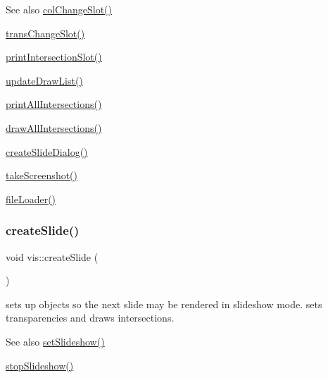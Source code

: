 \begin{DoxySeeAlso}{See also}
\mbox{\hyperlink{classvis_ad217326086a9f0cfc1e35df9c7ccf9c0}{col\+Change\+Slot()}} 

\mbox{\hyperlink{classvis_af2c43f4aaebe6ee5047e8eb9e9e8eedd}{trans\+Change\+Slot()}} 

\mbox{\hyperlink{classvis_a192e67455047ca991fb29fbd4074c11d}{print\+Intersection\+Slot()}} 

\mbox{\hyperlink{classvis_afd17774826a24e88c4f2eae14d85c7b4}{update\+Draw\+List()}} 

\mbox{\hyperlink{classvis_af09e2926e8e8dfa0eca3d6b2f3946fdd}{print\+All\+Intersections()}} 

\mbox{\hyperlink{classvis_aca0a94b8f2256122fc6e004a4d7de6e6}{draw\+All\+Intersections()}} 

\mbox{\hyperlink{classvis_a09be90ab62dec1dcf2a72690d254acfb}{create\+Slide\+Dialog()}} 

\mbox{\hyperlink{classvis_aa44c7eaf89bd4bc5dbcd75d4e2458ec7}{take\+Screenshot()}} 

\mbox{\hyperlink{classvis_a2886cfbc9070b5622347b1c6c87dfe18}{file\+Loader()}} 
\end{DoxySeeAlso}
\mbox{\label{classvis_a131dcf83ee61359b99624ea2538898a4}} 
\subsubsection{\texorpdfstring{create\+Slide()}{createSlide()}}
{\footnotesize\ttfamily void vis\+::create\+Slide (\begin{DoxyParamCaption}{ }\end{DoxyParamCaption})}

sets up objects so the next slide may be rendered in slideshow mode. sets transparencies and draws intersections.

\begin{DoxySeeAlso}{See also}
\mbox{\hyperlink{classvis_ae8441d597e876882029ee13b16aa4cc2}{set\+Slideshow()}} 

\mbox{\hyperlink{classvis_a74dfdd319ae733d8ff96aa60bccd65b7}{stop\+Slideshow()}} 
\end{DoxySeeAlso}
\mbox{\label{classvis_a09be90ab62dec1dcf2a72690d254acfb}} 
